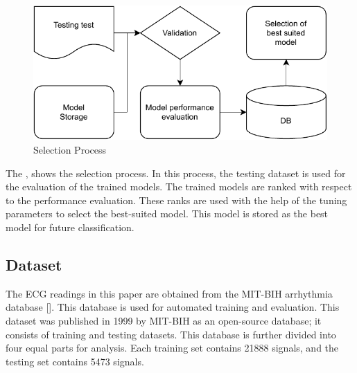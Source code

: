 \begin{figure}[ht]
    \centering
    \includegraphics[width=0.7\columnwidth]{media/ch_dataset_and_methods/selector.pdf}
    \caption{Selection Process}
    \label{fig:selection_process}
\end{figure}

The , shows the selection process. In this process, the testing dataset is used for the evaluation of the trained models. The trained models are ranked with respect to the performance evaluation. These ranks are used with the help of the tuning parameters to select the best-suited model. This model is stored as the best model for future classification.

\subsection{Dataset}
The ECG readings in this paper are obtained from the MIT-BIH arrhythmia database []. This database is used for automated training and evaluation. This dataset was published in 1999 by MIT-BIH as an open-source database; it consists of training and testing datasets. This database is further divided into four equal parts for analysis. Each training set contains 21888 signals, and the testing set contains 5473 signals.
